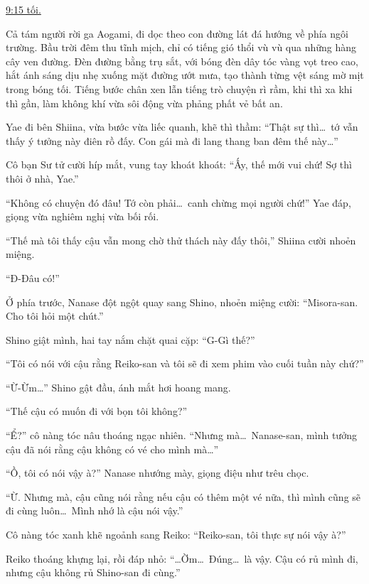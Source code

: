 \documentclass[../main.tex]{subfiles}
\begin{document}
\ct

\begin{center}
  \uline{9:15 tối.}
\end{center}

Cả tám người rời ga Aogami, đi dọc theo con đường lát đá hướng về phía ngôi trường. Bầu trời đêm thu tĩnh mịch, chỉ có tiếng gió thổi vù vù qua những hàng cây ven đường. Đèn đường bằng trụ sắt, với bóng đèn dây tóc vàng vọt treo cao, hắt ánh sáng dịu nhẹ xuống mặt đường ướt mưa, tạo thành từng vệt sáng mờ mịt trong bóng tối. Tiếng bước chân xen lẫn tiếng trò chuyện rì rầm, khi thì xa khi thì gần, làm không khí vừa sôi động vừa phảng phất vẻ bất an.

Yae đi bên Shiina, vừa bước vừa liếc quanh, khẽ thì thầm: ``Thật sự thì\dots\ tớ vẫn thấy ý tưởng này điên rồ đấy. Con gái mà đi lang thang ban đêm thế này\dots''

Cô bạn Sư tử cười híp mắt, vung tay khoát khoát: ``Ấy, thế mới vui chứ! Sợ thì thôi ở nhà, Yae.''


``Không có chuyện đó đâu! Tớ còn phải\dots\ canh chừng mọi người chứ!'' Yae đáp, giọng vừa nghiêm nghị vừa bối rối.

``Thế mà tôi thấy cậu vẫn mong chờ thử thách này đấy thôi,'' Shiina cười nhoẻn miệng.

``Đ-Đâu có!''

Ở phía trước, Nanase đột ngột quay sang Shino, nhoẻn miệng cười: ``Misora-san. Cho tôi hỏi một chút.''

Shino giật mình, hai tay nắm chặt quai cặp: ``G-Gì thế?''

``Tôi có nói với cậu rằng Reiko-san và tôi sẽ đi xem phim vào cuối tuần này chứ?''

``Ừ-Ừm\dots'' Shino gật đầu, ánh mắt hơi hoang mang.

``Thế cậu có muốn đi với bọn tôi không?''

``Ể?'' cô nàng tóc nâu thoáng ngạc nhiên. ``Nhưng mà\dots\ Nanase-san, mình tưởng cậu đã nói rằng cậu không có vé cho mình mà\dots''

``Ồ, tôi có nói vậy à?'' Nanase nhướng mày, giọng điệu như trêu chọc.

``Ừ. Nhưng mà, cậu cũng nói rằng nếu cậu có thêm một vé nữa, thì mình cũng sẽ đi cùng luôn\dots\ Mình nhớ là cậu nói vậy.''

Cô nàng tóc xanh khẽ ngoảnh sang Reiko: ``Reiko-san, tôi thực sự nói vậy à?''

Reiko thoáng khựng lại, rồi đáp nhỏ: ``\dots Ờm\dots\ Đúng\dots\ là vậy. Cậu có rủ mình đi, nhưng cậu không rủ Shino-san đi cùng.''
\end{document}
